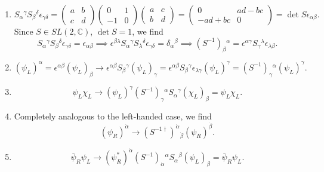 \begin{solution}
    \begin{enumerate}[label=\roman*)]
    \item
    \begin{equation}
        S_\alpha{}^\gamma S_\beta{}^\delta \epsilon_{\gamma \delta} = \begin{pmatrix}
            a &  b\\ c &d
        \end{pmatrix}\begin{pmatrix}
            0 & 1 \\ -1 &0
        \end{pmatrix}
        \begin{pmatrix}
            a & c\\ b &d
        \end{pmatrix} = \begin{pmatrix}
                        0 & ad-bc \\ -ad +bc &0
        \end{pmatrix} = \det S \epsilon_{\alpha \beta}.
    \end{equation}
    Since $S \in SL(2,\mathbb{C})$, $\det S = 1$, we find
    \begin{equation}
        S_\alpha{}^\gamma S_\beta{}^\delta \epsilon_{\gamma \delta} = \epsilon_{\alpha \beta} \implies  \epsilon^{\beta \lambda}S_\alpha{}^\gamma S_\lambda{}^\delta \epsilon_{\gamma \delta} = \delta_\alpha{}^\beta \implies (S^{-1})_\beta{}^\alpha
    =\epsilon^{\alpha\gamma}S_\gamma{}^\lambda
    \epsilon_{\lambda\beta}.
    \end{equation}
    \item \begin{equation}
        (\psi_L)^\alpha = \epsilon^{\alpha \beta } (\psi_L)_\beta \to \epsilon^{\alpha\beta}S_\beta{}^\gamma(\psi_L)_\gamma = \epsilon^{\alpha\beta}S_\beta{}^\gamma\epsilon_{\lambda\gamma}(\psi_L)^\gamma = (S^{-1})_\gamma{}^\alpha (\psi_L)^\gamma.
    \end{equation}
    \item \begin{equation}
        \psi_L \chi_L \to (\psi_L)^\gamma(S^{-1})_\gamma{}^\alpha S_\alpha{}^\gamma(\chi_L)_\beta = \psi_L \chi_L .
    \end{equation}
    \item Completely analogous to the left-handed case, we find
    \begin{equation}
        (\psi_R)^{\dot \alpha} \to (S^{-1\dagger})^{\dot \alpha}{}_{\dot \beta} (\psi_R)^{\dot \beta}.
    \end{equation}
    \item \begin{equation}
        \bar \psi_R \psi_L \to (\psi_R^*)^{\dot \alpha}(S^{-1})_{\dot \alpha}{}^\alpha S_\alpha{}^\beta(\psi_L)_\beta =  \bar \psi_R \psi_L.
    \end{equation}
    \end{enumerate}
\end{solution}


